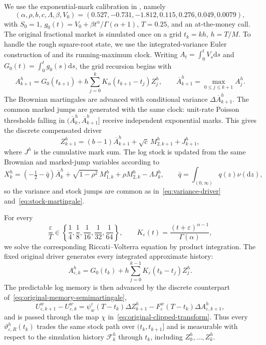 \documentclass[11pt]{article}
\theoremstyle{definition}
\theoremstyle{remark}
\newcommand{\F}{\mathcal{F}}
\newcommand{\1}{\mathbf{1}}
\newcommand{\dd}{\mathrm{d}}
\begin{document}
We use the exponential-mark calibration in \citet{bondi2024}, namely
\[
 (\alpha,\rho,b,c,\Lambda,\beta,V_0)
 =(0.527,-0.731,-1.812,0.115,0.276,0.049,0.0079),
\]
with $S_0=1$, $g_0(t)=V_0+\beta t^\alpha/\Gamma(\alpha+1)$,
$T=0.25$, and an at-the-money call. The original fractional market is
simulated once on a grid $t_k=kh$, $h=T/M$. To handle the rough square-root
state, we use the integrated-variance Euler construction of
\citet{richardtan2023} and its running-maximum clock. Writing
$A_t=\int_0^tV_s\dd s$ and
$G_0(t)=\int_0^tg_0(s)\dd s$, the grid recursion begins with
\begin{equation}
\label{eq:numerical-integrated-variance}
 A_{k+1}^h=G_0(t_{k+1})
   +h\sum_{j=0}^{k}K_\alpha(t_{k+1}-t_j)Z_j^h,
 \qquad
 \overline A_{k+1}^h=\max_{0\leq j\leq k+1}A_j^h.
\end{equation}
The Brownian martingales are advanced with conditional variance
$\Delta\overline A_{k+1}^h$. The common marked jumps are generated with the
same clock: unit-rate Poisson thresholds falling in
$(\overline A_k^h,\overline A_{k+1}^h]$ receive independent exponential
marks. This gives the discrete compensated driver
\[
 Z_{k+1}^h=(b-1)\overline A_{k+1}^h
       +\sqrt c\,M_{2,k+1}^h+J_{k+1}^h,
\]
where $J^h$ is the cumulative mark sum. The log stock is updated from the
same Brownian and marked-jump variables according to
\[
 X_k^h=(-\tfrac12-\bar q)\overline A_k^h
 +\sqrt{1-\rho^2}\,M_{1,k}^h+\rho M_{2,k}^h-\Lambda J_k^h,
 \qquad \bar q=\int_{(0,\infty)}q(z)\nu(\dd z),
\]
so the variance and stock jumps are common as in~\eqref{eq:variance-driver} and~\eqref{eq:stock-martingale}.

For every
\[
 \frac{\varepsilon}{T}\in
 \left\{\frac14,\frac18,\frac1{16},\frac1{32},\frac1{64}\right\},
 \qquad
 K_\varepsilon(t)=\frac{(t+\varepsilon)^{\alpha-1}}
                         {\Gamma(\alpha)},
\]
we solve the corresponding Riccati--Volterra equation by product integration.
The fixed original driver generates every integrated approximate history:
\begin{equation}
\label{eq:numerical-fixed-history}
 A_{\varepsilon,k}^h=G_0(t_k)
 +h\sum_{j=0}^{k-1}K_\varepsilon(t_k-t_j)Z_j^h.
\end{equation}
The predictable log memory is then advanced by the discrete counterpart
of~\eqref{eq:original-memory-semimartingale},
\[
 U_{\varepsilon,k+1}^w-U_{\varepsilon,k}^w
 =\psi_w^\varepsilon(T-t_k)\Delta Z_{k+1}^h
  -F_\varepsilon^w(T-t_k)\Delta A_{\varepsilon,k+1}^h,
\]
and is passed through the map $\chi$ in~\eqref{eq:original-clipped-transform}. Thus every
$\vartheta_{\varepsilon,R}^h(t_k)$ trades the same stock path over
$(t_k,t_{k+1}]$ and is measurable with respect to the simulation history
$\F_k^h$ through $t_k$, including $Z_0^h,\ldots,Z_k^h$.
\end{document}
